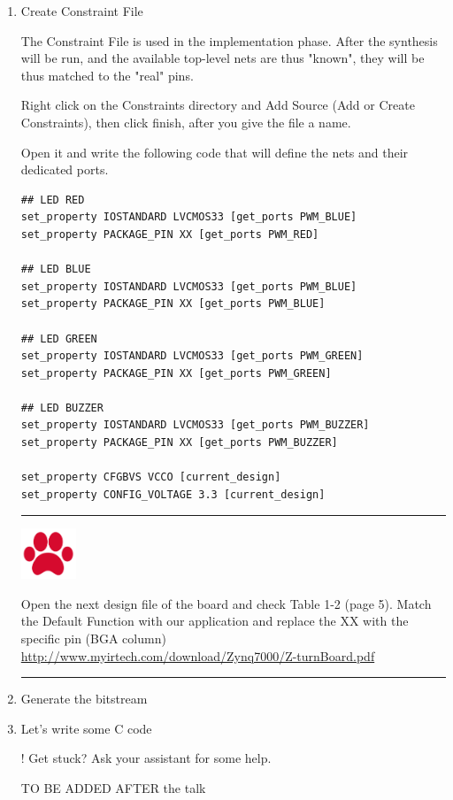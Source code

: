 \documentclass[letterpaper, portrait, margin=0.8in]{article}
\begin{document}
\begin{enumerate}
 \item Create Constraint File
 
The Constraint File is used in the implementation phase. After the synthesis will be run, and the available top-level nets are thus "known", they will be thus matched to the "real" pins.
  
Right click on the Constraints directory and Add Source (Add or Create Constraints), then click finish, after you give the file a name.

Open it and write the following code that will define the nets and their dedicated ports.

\begin{verbatim}
## LED RED
set_property IOSTANDARD LVCMOS33 [get_ports PWM_BLUE]
set_property PACKAGE_PIN XX [get_ports PWM_RED]

## LED BLUE
set_property IOSTANDARD LVCMOS33 [get_ports PWM_BLUE]
set_property PACKAGE_PIN XX [get_ports PWM_BLUE]

## LED GREEN
set_property IOSTANDARD LVCMOS33 [get_ports PWM_GREEN]
set_property PACKAGE_PIN XX [get_ports PWM_GREEN]

## LED BUZZER
set_property IOSTANDARD LVCMOS33 [get_ports PWM_BUZZER]
set_property PACKAGE_PIN XX [get_ports PWM_BUZZER]

set_property CFGBVS VCCO [current_design]
set_property CONFIG_VOLTAGE 3.3 [current_design]

\end{verbatim}

\noindent\rule{16.5cm}{1pt}

\noindent\begin{minipage}{.1\textwidth}
  \centering
  \includegraphics[height=1.5cm]{img/icon.png}
\end{minipage}
\begin{minipage}{.8\textwidth}
Open the next design file of the board and check Table 1-2 (page 5). Match the Default Function with our application and replace the XX with the specific pin (BGA column)
\url{http://www.myirtech.com/download/Zynq7000/Z-turnBoard.pdf}
\end{minipage}%

\noindent\rule{16.5cm}{1pt}


\item Generate the bitstream





 \item Let's write some C code
 
 ! Get stuck? Ask your assistant for some help.
 
 
 TO BE ADDED AFTER the talk
\end{enumerate}
\end{document}
